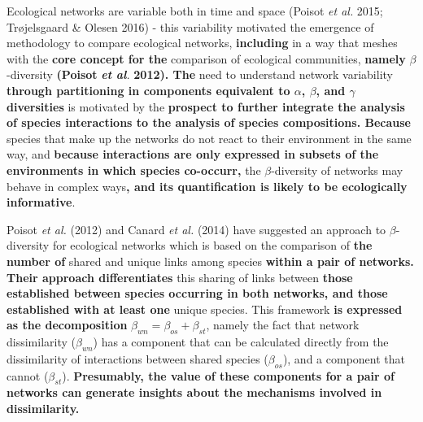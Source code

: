 \documentclass[11pt]{article}
\makeatletter
\def\maxwidth{\ifdim\Gin@nat@width>\linewidth\linewidth
\else\Gin@nat@width\fi}
\let\Oldincludegraphics\includegraphics
\renewcommand{\includegraphics}[1]{\Oldincludegraphics[width=\maxwidth]{#1}}
\providecommand{\DIFaddtex}[1]{{\bf #1}} %
\providecommand{\DIFdeltex}[1]{} %
\providecommand{\DIFaddbegin}{\protect\color{blue}} %
\providecommand{\DIFaddend}{\protect\color{black}} %
\providecommand{\DIFdelbegin}{\protect\color{red}} %
\providecommand{\DIFdelend}{\protect\color{black}} %
\providecommand{\DIFadd}[1]{\texorpdfstring{\DIFaddtex{#1}}{#1}} %
\providecommand{\DIFdel}[1]{\texorpdfstring{\DIFdeltex{#1}}{}} %
\newcommand{\DIFscaledelfig}{0.5}
\newlength{\DIFdelgraphicswidth} %
\newlength{\DIFdelgraphicsheight} %
\newcommand{\DIFaddincludegraphics}[2][]{{\color{blue}\fbox{\DIFOincludegraphics[#1]{#2}}}} %
\newcommand{\DIFdelincludegraphics}[2][]{%
\sbox{\DIFdelgraphicsbox}{\DIFOincludegraphics[#1]{#2}}%
\settoboxwidth{\DIFdelgraphicswidth}{\DIFdelgraphicsbox} %
\settoboxtotalheight{\DIFdelgraphicsheight}{\DIFdelgraphicsbox} %
\scalebox{\DIFscaledelfig}{%
\parbox[b]{\DIFdelgraphicswidth}{\usebox{\DIFdelgraphicsbox}\\[-\baselineskip] \rule{\DIFdelgraphicswidth}{0em}}\llap{\resizebox{\DIFdelgraphicswidth}{\DIFdelgraphicsheight}{%
\setlength{\unitlength}{\DIFdelgraphicswidth}%
\begin{picture}(1,1)%
\thicklines\linethickness{2pt} %
{\color[rgb]{1,0,0}\put(0,0){\framebox(1,1){}}}%
{\color[rgb]{1,0,0}\put(0,0){\line( 1,1){1}}}%
{\color[rgb]{1,0,0}\put(0,1){\line(1,-1){1}}}%
\end{picture}%
}\hspace*{3pt}}} %
} %
\DeclareRobustCommand{\DIFaddbegin}{\DIFOaddbegin \let\includegraphics\DIFaddincludegraphics} %
\DeclareRobustCommand{\DIFaddend}{\DIFOaddend \let\includegraphics\DIFOincludegraphics} %
\DeclareRobustCommand{\DIFdelbegin}{\DIFOdelbegin \let\includegraphics\DIFdelincludegraphics} %
\DeclareRobustCommand{\DIFdelend}{\DIFOaddend \let\includegraphics\DIFOincludegraphics} %
\makeatother
\begin{document}
Ecological networks are variable both in time and space (Poisot \emph{et
al.} 2015; Trøjelsgaard \& Olesen 2016) - this variability motivated the
emergence of methodology to compare ecological networks, \DIFaddbegin \DIFadd{including }\DIFaddend in a
way that meshes with the \DIFdelbegin \DIFdel{usual approaches of }\DIFdelend \DIFaddbegin \DIFadd{core concept for the }\DIFaddend comparison of ecological
communities, \DIFdelbegin \DIFdel{\emph{i.e.} \(\beta\)-diversity; although the definiton of
}\DIFdelend \DIFaddbegin \DIFadd{namely }\DIFaddend \(\beta\)-diversity \DIFdelbegin \DIFdel{is a contentious topic amongst community ecologists
(see }\DIFdelend \DIFaddbegin \DIFadd{(Poisot }\DIFaddend \emph{\DIFdelbegin \DIFdel{e.g}\DIFdelend \DIFaddbegin \DIFadd{et al}\DIFaddend .} \DIFdelbegin \DIFdel{Tuomisto 2010), the }\DIFdelend \DIFaddbegin \DIFadd{2012). The
}\DIFaddend need to understand network variability \DIFaddbegin \DIFadd{through partitioning in
components equivalent to \(\alpha\), \(\beta\), and \(\gamma\)
diversities }\DIFaddend is motivated by the \DIFdelbegin \DIFdel{fact that }\DIFdelend \DIFaddbegin \DIFadd{prospect to further integrate the
analysis of species interactions to the analysis of species
compositions. Because }\DIFaddend species that make up the networks do not react to
their environment in the same way, and \DIFdelbegin \DIFdel{therefore }\DIFdelend \DIFaddbegin \DIFadd{because interactions are only
expressed in subsets of the environments in which species co-occurr, }\DIFaddend the
\(\beta\)-diversity of networks may behave in complex ways\DIFaddbegin \DIFadd{, and its
quantification is likely to be ecologically informative}\DIFaddend .

Poisot \emph{et al.} (2012) and Canard \emph{et al.} (2014) have
suggested an approach to \(\beta\)-diversity for ecological networks
which is based on the comparison of \DIFaddbegin \DIFadd{the number of }\DIFaddend shared and unique
links among species \DIFdelbegin \DIFdel{, and differentiate }\DIFdelend \DIFaddbegin \DIFadd{within a pair of networks. Their approach
differentiates }\DIFaddend this sharing of links between \DIFdelbegin \DIFdel{common and }\DIFdelend \DIFaddbegin \DIFadd{those established between
species occurring in both networks, and those established with at least
one }\DIFaddend unique species. This framework \DIFdelbegin \DIFdel{can be summarized as }\DIFdelend \DIFaddbegin \DIFadd{is expressed as the decomposition
}\DIFaddend \(\beta_{wn} = \beta_{os} + \beta_{st}\), namely the fact that \DIFdelbegin \DIFdel{overall
}\DIFdelend network
dissimilarity (\(\beta_{wn}\)) has a component that can be calculated
directly from the dissimilarity of interactions between shared species
(\(\beta_{os}\)), and a component that cannot \DIFdelbegin \DIFdel{, the later
originating in unique species introducing their unique interactions
}\DIFdelend (\(\beta_{st}\)).
\DIFaddbegin \DIFadd{Presumably, the value of these components for a pair of networks can
generate insights about the mechanisms involved in dissimilarity.
}
\end{document}
